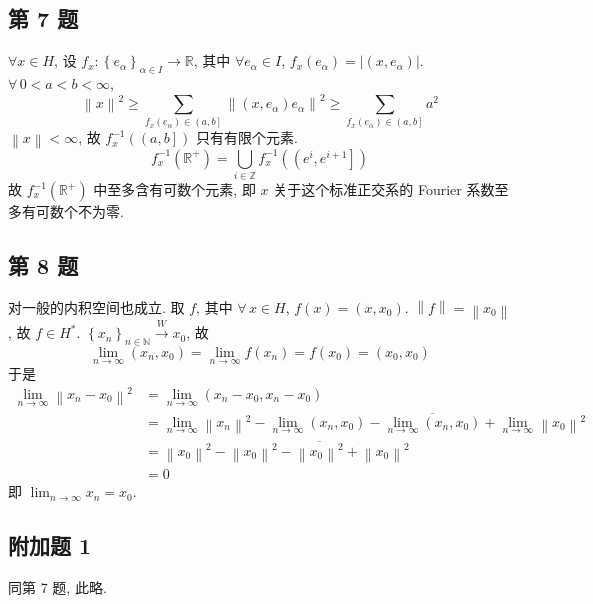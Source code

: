 \documentclass[../main.tex]{subfiles}
\begin{document}
\subsection{第 7 题}
$\forall x \in H$, 设 $f_x : \left\{ e_\alpha \right\}_{\alpha \in I} \to \mathbb{R}$, 其中 $\forall e_\alpha \in I$, $f_x \left( e_\alpha \right) = \left| \left( x, e_\alpha \right) \right|$.
$\forall \, 0 < a < b < \infty$,
\[
    \left\| x \right\|^2
    \geqslant
    \sum_{f_x \left( e_\alpha \right) \in \left( a, b \right]} \left\| \left( x, e_\alpha \right) e_\alpha \right\|^2
    \geqslant
    \sum_{f_x \left( e_\alpha \right) \in \left( a, b \right]} a^2
\]
$\left\| x \right\| < \infty$, 故 $f_x^{-1} \left( \left( a, b \right] \right)$ 只有有限个元素.
\[
    f_x^{-1} \left( \mathbb{R}^{+} \right)
    =
    \bigcup_{i \in \mathbb{Z}} f_x^{-1} \left( \left( e^i, e^{i + 1} \right] \right)
\]
故 $f_x^{-1} \left( \mathbb{R}^{+} \right)$ 中至多含有可数个元素, 即 $x$ 关于这个标准正交系的 Fourier 系数至多有可数个不为零.

\subsection{第 8 题}
对一般的内积空间也成立.
取 $f$, 其中 $\forall \, x \in H$, $f \left( x \right) = \left( x, x_0 \right)$.
$\left\| f \right\| = \left\| x_0 \right\|$, 故 $f \in H^*$.
$\left\{ x_n \right\}_{n \in \mathbb{N}} \xrightarrow{W} x_0$,
故
\[
    \lim_{n \to \infty} \left( x_n, x_0 \right)
    =
    \lim_{n \to \infty} f \left( x_n \right)
    =
    f \left( x_0 \right)
    =
    \left( x_0, x_0 \right)
\]
于是
\begin{align*}
    \lim_{n \to \infty} \left\| x_n - x_0 \right\|^2
    &=
    \lim_{n \to \infty} \left( x_n - x_0, x_n - x_0 \right) \\
    &=
    \lim_{n \to \infty} \left\| x_n \right\|^2 - \lim_{n \to \infty} \left( x_n, x_0 \right) - \overline{\lim_{n \to \infty} \left( x_n, x_0 \right)} + \lim_{n \to \infty} \left\| x_0 \right\|^2 \\
    &= \left\| x_0 \right\|^2 - \left\| x_0 \right\|^2 - \overline{\left\| x_0 \right\|^2} + \left\| x_0 \right\|^2 \\
    &=
    0
\end{align*}
即 $\displaystyle\lim_{n \to \infty} x_n = x_0$.

\subsection{附加题 1}
同第 7 题, 此略.
\end{document}
